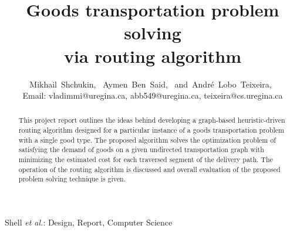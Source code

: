 \documentclass[journal,onecolumn]{IEEEtran}
\begin{document}
%
\title{Goods transportation problem solving \\ via routing algorithm}
\author{Mikhail~Shchukin,~
        Aymen~Ben~Said,~
        and~André~Lobo~Teixeira,~
        \\
Email: vladimmi@uregina.ca, abb549@uregina.ca, teixeira@cs.uregina.ca}



%
{Shell \MakeLowercase{\textit{et al.}}: Design, Report, Computer Science}
% 

\maketitle

\begin{abstract}
This project report outlines the ideas behind developing a graph-based heuristic-driven routing algorithm 
designed for a particular instance of a goods transportation problem with a single good type.
The proposed algorithm solves the optimization problem of satisfying the demand of goods on a given undirected
transportation graph with minimizing the estimated cost for each traversed segment of the delivery path. The operation
of the routing algorithm is discussed and overall evaluation of the proposed problem solving technique is given.
\end{abstract}
\end{document}
